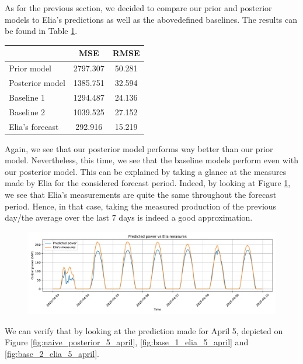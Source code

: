 \documentclass[a4paper, 12pt]{article}
\begin{document}
As for the previous section, we decided to compare our prior and posterior models to Elia's predictions as well as the abovedefined baselines. The results can be found in Table \ref{tab:pv_metrics_for}.
\begin{table}[h]
	\centering
    \begin{tabular}{l|c|c}
                        & MSE      & RMSE   \\ \hline
        Prior model     & 2797.307  & 50.281 \\ \hline
        Posterior model & 1385.751  & 32.594 \\ \hline
        Baseline 1      & 1294.487 & 24.136 \\ \hline
        Baseline 2      & 1039.525 & 27.152 \\ \hline
        Elia's forecast & 292.916  & 15.219
    \end{tabular}
    \label{tab:pv_metrics_for}
\end{table}
Again, we see that our posterior model performs way better than our prior model. Nevertheless, this time, we see that the baseline models perform even with our posterior model. This can be explained by taking a glance at the measures made by Elia for the considered forecast period. Indeed, by looking at Figure \ref{fig:prior_model}, we see that Elia's measurements are quite the same throughout the forecast period. Hence, in that case, taking the measured production of the previous day/the average over the last 7 days is indeed a good approximation.
\begin{figure}[H]
    \centering
    \includegraphics[width=\textwidth]{resources/pdf/province_naive_03-04-2020.pdf}
    \label{fig:prior_model}
\end{figure}

We can verify that by looking at the prediction made for April 5, depicted on Figure \ref{fig:naive_posterior_5_april}, \ref{fig:base_1_elia_5_april} and \ref{fig:base_2_elia_5_april}.
\end{document}
